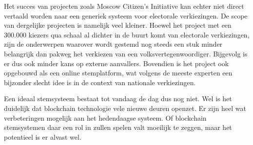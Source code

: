 	Het succes van projecten zoals Moscow Citizen's Initiative kan echter niet direct vertaald worden naar een generiek systeem voor electorale verkiezingen. De scope van dergelijke projecten is namelijk  veel kleiner. Hoewel het project met een 300.000 kiezers qua schaal al dichter in de buurt komt van electorale verkiezingen, zijn de onderwerpen waarover wordt gestemd nog steeds een stuk minder belangrijk dan pakweg het verkiezen van een volksvertegenwoordiger. Bijgevolg is er dus ook minder kans op externe aanvallers. Bovendien is het project ook opgebouwd als een online stemplatform, wat volgens de meeste experten een bijzonder slecht idee is in de context van nationale verkiezingen.
	
	Een ideaal stemsysteem bestaat tot vandaag de dag dus nog niet. Wel is het duidelijk dat blockchain technologie vele nieuwe deuren openzet. Er zijn heel wat verbeteringen mogelijk aan het hedendaagse systeem. Of blockchain stemsystemen daar een rol in zullen spelen valt moeilijk te zeggen, maar het potentieel is er alvast wel.
	
	

	
	
	
		
		
		
		
		
		
	